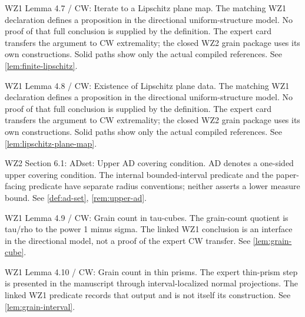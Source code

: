 \begin{remark}
\label{rem:atlas-L4_7}
WZ1 Lemma 4.7 / CW: Iterate to a Lipschitz plane map.
The matching WZ1 declaration defines a proposition in the directional uniform-structure model. No proof of that full conclusion is supplied by the definition. The expert card transfers the argument to CW extremality; the closed WZ2 grain package uses its own constructions. Solid paths show only the actual compiled references.
See \ref{lem:finite-lipschitz}.
\end{remark}

\begin{remark}
\label{rem:atlas-L4_8}
WZ1 Lemma 4.8 / CW: Existence of Lipschitz plane data.
The matching WZ1 declaration defines a proposition in the directional uniform-structure model. No proof of that full conclusion is supplied by the definition. The expert card transfers the argument to CW extremality; the closed WZ2 grain package uses its own constructions. Solid paths show only the actual compiled references.
See \ref{lem:lipschitz-plane-map}.
\end{remark}

\begin{remark}
\label{rem:atlas-DAD}
WZ2 Section 6.1: ADset: Upper AD covering condition.
AD denotes a one-sided upper covering condition. The internal bounded-interval predicate and the paper-facing predicate have separate radius conventions; neither asserts a lower measure bound.
See \ref{def:ad-set}, \ref{rem:upper-ad}.
\end{remark}

\begin{remark}
\label{rem:atlas-L4_9}
WZ1 Lemma 4.9 / CW: Grain count in tau-cubes.
The grain-count quotient is tau/rho to the power 1 minus sigma. The linked WZ1 conclusion is an interface in the directional model, not a proof of the expert CW transfer.
See \ref{lem:grain-cube}.
\end{remark}

\begin{remark}
\label{rem:atlas-L4_10}
WZ1 Lemma 4.10 / CW: Grain count in thin prisms.
The expert thin-prism step is presented in the manuscript through interval-localized normal projections. The linked WZ1 predicate records that output and is not itself its construction.
See \ref{lem:grain-interval}.
\end{remark}

